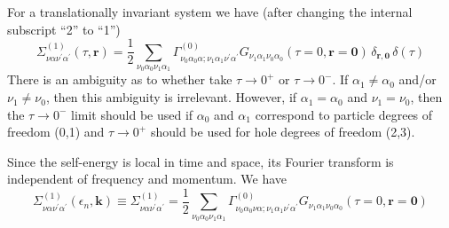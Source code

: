 For a translationally invariant system we have (after changing
the internal subscript ``2'' to ``1'')
\begin{equation}
\Sigma^{(1)}_{\nu\alpha \nu^{\prime}\alpha^{\prime}}(\tau,\mathbf{r}) =
\frac{1}{2} \sum_{\nu_0\alpha_0 \nu_1\alpha_1}
\Gamma^{(0)}_{\nu_0\alpha_0\alpha;\nu_1 \alpha_1 \nu^{\prime}\alpha^{\prime}}
G_{\nu_1\alpha_1 \nu_0\alpha_0}(\tau=0,\mathbf{r}=\mathbf{0})\,
\delta_{\mathbf{r},\mathbf{0}} \, \delta(\tau)
\end{equation}
There is an ambiguity as to whether take $\tau \to 0^+$ or
$\tau \to 0^-$.  If $\alpha_1 \neq \alpha_0$ and/or $\nu_1 \neq \nu_0$, 
then this
ambiguity is irrelevant.  However, if $\alpha_1 = \alpha_0$
and $\nu_1 = \nu_0$,
then the $\tau \to 0^-$ limit should be used if $\alpha_0$
and $\alpha_1$ correspond to particle degrees of freedom (0,1)
and $\tau \to 0^+$ should be used for hole degrees of freedom
(2,3).

Since the self-energy is local in time and space, its Fourier
transform is independent of frequency and momentum.  We have
\begin{equation}
\Sigma^{(1)}_{\nu\alpha \nu^{\prime}\alpha^{\prime}}(\epsilon_n,\mathbf{k}) \equiv
\Sigma^{(1)}_{\nu\alpha \nu^{\prime}\alpha^{\prime}} =
\frac{1}{2} \sum_{\nu_0\alpha_0 \nu_1\alpha_1}
\Gamma^{(0)}_{\nu_0\alpha_0\nu\alpha; \nu_1\alpha_1 \nu^{\prime}\alpha^{\prime}}
G_{\nu_1\alpha_1 \nu_0\alpha_0}(\tau=0,\mathbf{r}=\mathbf{0})
\end{equation}

